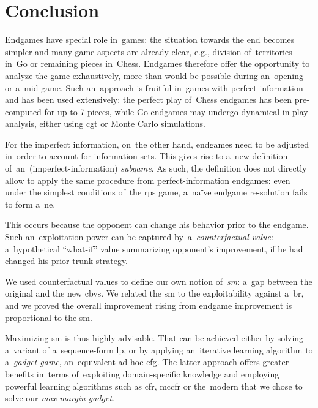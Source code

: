 \chapter*{Conclusion}
Endgames have special role in~games:
the situation towards the end becomes simpler and many game aspects are already clear, e.g., division of~territories in~Go or remaining pieces in~Chess.
Endgames therefore offer the opportunity to analyze the game exhaustively, more than would be possible during an~opening or a~mid-game.
Such an~approach is fruitful in~games with perfect information and has been used extensively:
the perfect play of~Chess endgames has been pre-computed for up to 7 pieces, while Go endgames may undergo dynamical in-play analysis, either using \acrlong{cgt} or Monte Carlo simulations.

For the imperfect information, on~the other hand, endgames need to be adjusted in~order to account for information sets.
This gives rise to a~new definition of~an~(imperfect-information) \emph{subgame}.
As such, the definition does not directly allow to apply the same procedure from perfect-information endgames:
even under the simplest conditions of~the \acrlong{rps} game, a~na{\"i}ve endgame re-solution fails to form a~\acrlong{ne}.

This occurs because the opponent can change his behavior prior to the endgame.
Such an~exploitation power can be captured by~a~\emph{counterfactual value}:
a~hypothetical ``what-if'' value summarizing opponent's improvement, if he had changed his prior trunk strategy.

We used counterfactual values to define our own notion of~\emph{\acrlong{sm}}:
a~gap between the original and the new \acrlong{cbv}s.
We related the \acrshort{sm} to the exploitability against a~\acrlong{br}, and we proved the overall improvement rising from endgame improvement is proportional to the \acrshort{sm}.

Maximizing \acrshort{sm} is thus highly advisable.
That can be achieved either by solving a~variant of a~sequence-form \acrlong{lp}, or by applying an~iterative learning algorithm to a~\emph{gadget game}, an~equivalent ad-hoc \acrlong{efg}.
The latter approach offers greater benefits in~terms of~exploiting domain-specific knowledge and employing powerful learning algorithms such as \acrshort{cfr}, \acrshort{mccfr} or the~modern \cfrplus{} that we chose to solve our \emph{max-margin gadget}.


